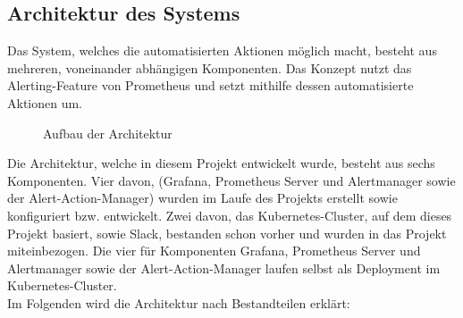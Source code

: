 \documentclass[a4paper,10pt]{scrartcl}
\begin{document}
\pagebreak
\subsection{Architektur des Systems}

Das System, welches die automatisierten Aktionen möglich macht, besteht aus mehreren, voneinander abhängigen Komponenten. Das Konzept nutzt das Alerting-Feature von Prometheus und setzt mithilfe dessen automatisierte Aktionen um.\\

\begin{figure}[htbp]
  \centering
  \scalebox{.6}{}
  \caption{Aufbau der Architektur}
\end{figure}

Die Architektur, welche in diesem Projekt entwickelt wurde, besteht aus sechs Komponenten. Vier davon, (Grafana, Prometheus Server und Alertmanager sowie der Alert-Action-Manager) wurden im Laufe des Projekts erstellt sowie konfiguriert bzw. entwickelt. Zwei davon, das Kubernetes-Cluster, auf dem dieses Projekt basiert, sowie Slack, bestanden schon vorher und wurden in das Projekt miteinbezogen. Die vier für Komponenten Grafana, Prometheus Server und Alertmanager sowie der Alert-Action-Manager laufen selbst als Deployment im Kubernetes-Cluster.\\
Im Folgenden wird die Architektur nach Bestandteilen erklärt:\\
\end{document}

